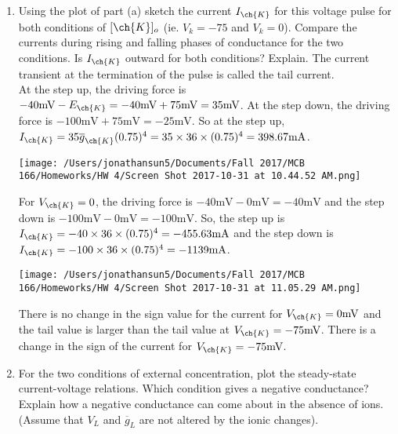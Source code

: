 \documentclass[11pt]{article}
\begin{document}
\begin{enumerate}[label=\arabic*.]
\begin{enumerate}[label=(\alph*)]
\item
Using the plot of part (a) sketch the current $I_{\ch{K}}$ for this voltage pulse for both conditions of $[\ch{K}]_o$ (ie. $V_k = -75$ and $V_k = 0$). Compare the currents during rising and falling phases of conductance for the two conditions. Is $I_{\ch{K}}$ outward for both conditions? Explain. The current transient at the termination of the pulse is called the tail current.
\vspace*{1\baselineskip}
\\
At the step up, the driving force is $-40 \text{mV} - E_{\ch{K}} = -40 \text{mV} + 75 \text{mV} = 35 \text{mV}$. At the step down, the driving force is $-100 \text{mV} + 75 \text{mV} = -25 \text{mV}$. So at the step up, $I_{\ch{K}} = 35 \overline{g}_{\ch{K}}(0.75)^4 = 35 \times 36 \times (0.75)^4 = 398.67 \text{mA}$.
\begin{center}
\texttt{[image: /Users/jonathansun5/Documents/Fall 2017/MCB 166/Homeworks/HW 4/Screen Shot 2017-10-31 at 10.44.52 AM.png]}
\end{center}
For $V_{\ch{K}} = 0$, the driving force is $-40 \text{mV} - 0 \text{mV} = -40 \text{mV}$ and the step down is $-100 \text{mV} - 0 \text{mV} = -100 \text{mV}$. So, the step up is $I_{\ch{K}} = -40 \times 36 \times (0.75)^4 = -455.63 \text{mA}$ and the step down is $I_{\ch{K}} = -100 \times 36 \times (0.75)^4 = -1139 \text{mA}$.
\begin{center}
\texttt{[image: /Users/jonathansun5/Documents/Fall 2017/MCB 166/Homeworks/HW 4/Screen Shot 2017-10-31 at 11.05.29 AM.png]}
\end{center}
There is no change in the sign value for the current for $V_{\ch{K}} = 0 \text{mV}$ and the tail value is larger than the tail value at $V_{\ch{K}} = -75 \text{mV}$. There is a change in the sign of the current for $V_{\ch{K}} = -75 \text{mV}$.



\item
For the two conditions of external  concentration, plot the steady-state current-voltage relations. Which condition gives a negative conductance? Explain how a negative conductance can come about in the absence of  ions. (Assume that $V_L$ and $\overline{g}_{L}$ are not altered by the ionic changes).

















\end{enumerate}
\end{enumerate}
\end{document}
